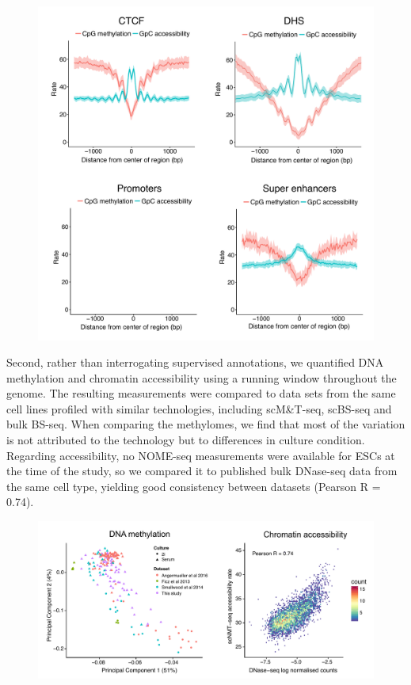 \begin{figure}[H]
	\centering
	\includegraphics[width=0.8\linewidth]{scNMT_pseudobulk_profiles}
	\caption[]{}
	\label{fig:scnmt_profiles}
\end{figure}





Second, rather than interrogating supervised annotations, we quantified DNA methylation and chromatin accessibility using a running window throughout the genome. The resulting measurements were compared to data sets from the same cell lines profiled with similar technologies, including scM\&T-seq\cite{XX}, scBS-seq\cite{XX} and bulk BS-seq\cite{XX}. When comparing the methylomes, we find that most of the variation is not attributed to the technology but to differences in culture condition.\\
Regarding accessibility, no NOME-seq measurements were available for ESCs at the time of the study, so we compared it to published bulk DNase-seq data from the same cell type, yielding good consistency between datasets (Pearson R = 0.74).
\begin{figure}[H]
	\centering
	\includegraphics[width=1.0\linewidth]{scNMT_comparison}
	\caption[]{}
	\label{fig:scnmt_comparison}
\end{figure}

